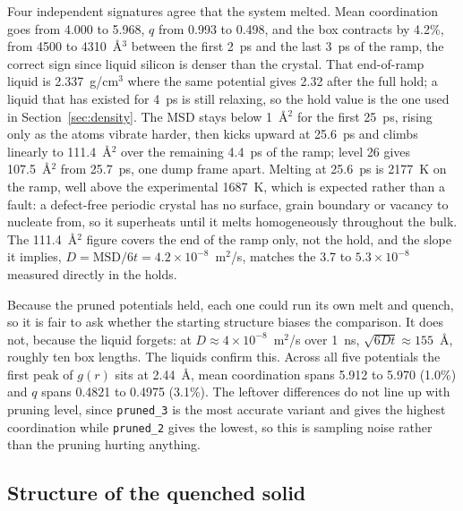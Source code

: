 \documentclass[11pt]{article}
\begin{document}
Four independent signatures agree that the system melted. Mean coordination goes from 4.000 to 5.968, $q$ from 0.993 to 0.498, and the box contracts by 4.2\%, from 4500 to 4310~\AA$^3$ between the first 2~ps and the last 3~ps of the ramp, the correct sign since liquid silicon is denser than the crystal. That end-of-ramp liquid is 2.337~g/cm$^3$ where the same potential gives 2.32 after the full hold; a liquid that has existed for 4~ps is still relaxing, so the hold value is the one used in Section~\ref{sec:density}. The MSD stays below 1~\AA$^2$ for the first 25~ps, rising only as the atoms vibrate harder, then kicks upward at 25.6~ps and climbs linearly to 111.4~\AA$^2$ over the remaining 4.4~ps of the ramp; level 26 gives 107.5~\AA$^2$ from 25.7~ps, one dump frame apart. Melting at 25.6~ps is 2177~K on the ramp, well above the experimental 1687~K, which is expected rather than a fault: a defect-free periodic crystal has no surface, grain boundary or vacancy to nucleate from, so it superheats until it melts homogeneously throughout the bulk. The 111.4~\AA$^2$ figure covers the end of the ramp only, not the hold, and the slope it implies, $D=\mathrm{MSD}/6t=4.2\times10^{-8}$~m$^2$/s, matches the 3.7 to $5.3\times10^{-8}$ measured directly in the holds.

Because the pruned potentials held, each one could run its own melt and quench, so it is fair to ask whether the starting structure biases the comparison. It does not, because the liquid forgets: at $D\approx4\times10^{-8}$~m$^2$/s over 1~ns, $\sqrt{6Dt}\approx155$~\AA, roughly ten box lengths. The liquids confirm this. Across all five potentials the first peak of $g(r)$ sits at 2.44~\AA, mean coordination spans 5.912 to 5.970 (1.0\%) and $q$ spans 0.4821 to 0.4975 (3.1\%). The leftover differences do not line up with pruning level, since \texttt{pruned\_3} is the most accurate variant and gives the highest coordination while \texttt{pruned\_2} gives the lowest, so this is sampling noise rather than the pruning hurting anything.

\subsection{Structure of the quenched solid}
\end{document}
